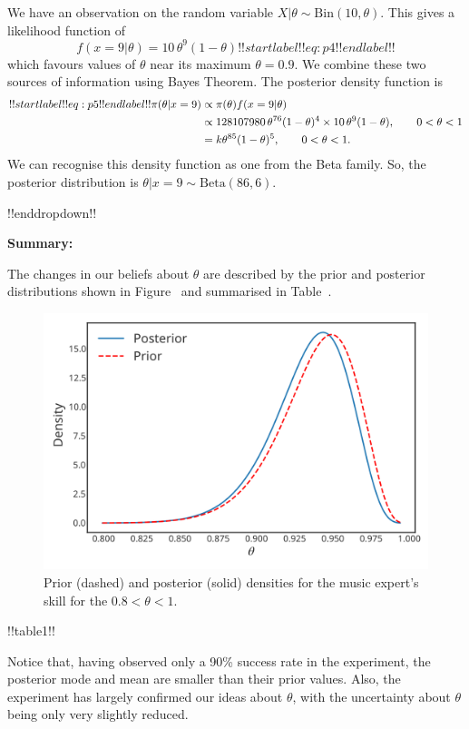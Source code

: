 {We have an observation on the random variable $X|\theta\sim
        \mathrm{Bin}(10,\theta)$. This gives a likelihood function of
        \begin{equation}
        f(x=9|\theta)=10\,\theta^9(1-\theta)
        !!startlabel!! eq:p4 !!endlabel!!
        \end{equation}
        which favours values of $\theta$ near its maximum $\theta=0.9$. We combine these two sources of information using Bayes Theorem. The posterior density function is 
        \begin{align}
        !!startlabel!! eq:p5 !!endlabel!!
        \pi(\theta|x=9)&\propto\pi(\theta)f(x=9|\theta) \notag \\
        &\propto 128107980\,\theta^{76}(1-\theta)^4\times 10\,\theta^9(1-\theta),
        \quad\quad 0<\theta<1 \notag \\
        &=k\theta^{85}(1-\theta)^5,\quad\quad 0<\theta<1.
        \end{align}
        We can recognise this density function as one from the Beta family. So, the posterior distribution is $\theta|x=9\sim
        \mathrm{Beta}(86,6)$.

!!enddropdown!!

\textbf{Summary:}

The changes in our beliefs about $\theta$ are described by the prior and posterior distributions shown in Figure~ and summarised in Table~.
\begin{figure}[h!]

\includegraphics{images/priorposterior1.svg}
\caption{Prior (dashed) and posterior (solid) densities for the music expert's skill for the $0.8 < \theta < 1$.}


\end{figure}



!!table1!!

Notice that, having observed only a 90\% success rate in the experiment, the posterior mode and mean are smaller than their prior values. Also, the experiment has largely confirmed our ideas about $\theta$, with the uncertainty about $\theta$ being only very slightly reduced.}



